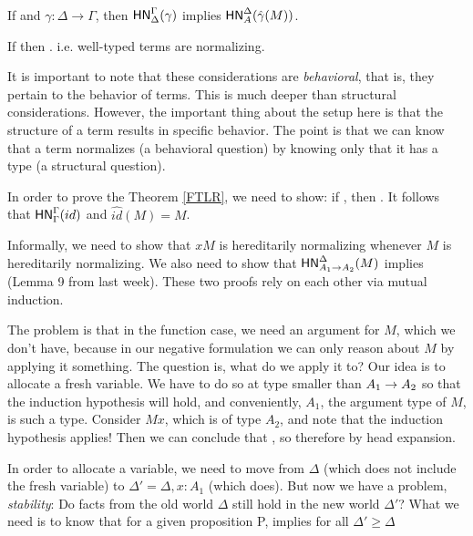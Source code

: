 \documentclass{article}
\begin{document}
\begin{theorem}
\label{FTLR}
If  and $\gamma: \Delta \to \Gamma$, then $\mathsf{HN}^{\Gamma}_{\Delta}(\gamma)$ implies $\mathsf{HN}^{\Delta}_{A}(\hat{\gamma}(M))$.
 \end{theorem}

 \begin{corollary}
  If  then . i.e. well-typed terms are normalizing.
 \end{corollary}

 It is important to note that these considerations are \textit{behavioral}, that is, they pertain to the behavior of terms. This is much deeper than structural considerations. However, the important thing about the setup here is that the structure of a term results in specific behavior. The point is that we can know that a term normalizes (a behavioral question) by knowing only that it has a type (a structural question).

In order to prove the Theorem \ref{FTLR}, we need to show: if , then . It follows that $\mathsf{HN}^{\Gamma}_{\Gamma}(id)$ and $\hat{id}(M) = M$.

Informally, we need to show that $xM$ is hereditarily normalizing whenever $M$ is hereditarily normalizing. We also need to show that $\mathsf{HN}^{\Delta}_{A_1 \to A_2}(M)$ implies  (Lemma 9 from last week). These two proofs rely on each other via mutual induction.

The problem is that in the function case, we need an argument for $M$, which we don't have, because in our negative formulation we can only reason about $M$ by applying it something. The question is, what do we apply it to? Our idea is to allocate a fresh variable. We have to do so at type smaller than $A_1 \to A_2$ so that the induction hypothesis will hold, and conveniently, $A_1$, the argument type of $M$, is such a type. Consider $Mx$, which is of type $A_2$, and note that the induction hypothesis applies! Then we can conclude that , so therefore  by head expansion.

In order to allocate a variable, we need to move from $\Delta$ (which does not include the fresh variable) to $\Delta' = \Delta, x: A_1$ (which does). But now we have a problem, \textit{stability}: Do facts from the old world $\Delta$ still hold in the new world $\Delta'$? What we need is to know that for a given proposition P,  implies  for all $\Delta' \geq \Delta$
\end{document}
